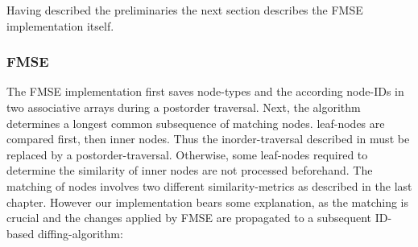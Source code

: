 Having described the preliminaries the next section describes the FMSE implementation itself.

\subsubsection{FMSE} The FMSE implementation first saves node-types and the according node-IDs in two associative arrays during a postorder traversal. Next, the algorithm determines a longest common subsequence of matching nodes. leaf-nodes are compared first, then inner nodes. Thus the inorder-traversal described in \cite{chawathe1996change} must be replaced by a postorder-traversal. Otherwise, some leaf-nodes required to determine the similarity of inner nodes are not processed beforehand. The matching of nodes involves two different similarity-metrics as described in the last chapter. However our implementation bears some explanation, as the matching is crucial and the changes applied by FMSE are propagated to a subsequent ID-based diffing-algorithm:

